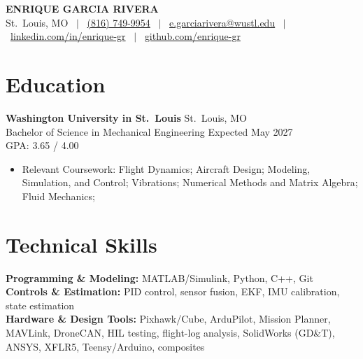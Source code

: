 \documentclass[11pt, letterpaper]{article}
\newcommand{\myphone}{(816) 749-9954}
\begin{document}
\begin{center}
{\fontsize{18pt}{22pt}\selectfont\bfseries ENRIQUE GARCIA RIVERA} \\[4pt]
\small
St.\ Louis, MO \ $|$ \ \href{tel:+18167499954}{\myphone} \ $|$ \
\href{mailto:e.garciarivera@wustl.edu}{e.garciarivera@wustl.edu} \ $|$ \
\href{https://www.linkedin.com/in/enrique-gr}{linkedin.com/in/enrique-gr} \ $|$ \
\href{https://github.com/enrique-gr}{github.com/enrique-gr}
\end{center}
\section{Education}
\textbf{Washington University in St.\ Louis} \hfill St.\ Louis, MO \\
Bachelor of Science in Mechanical Engineering \hfill Expected May 2027 \\
GPA: 3.65 / 4.00
\begin{itemize}
\item Relevant Coursework: Flight Dynamics; Aircraft Design; Modeling, Simulation, and Control; Vibrations; Numerical Methods and Matrix Algebra; Fluid Mechanics; 
\end{itemize}
\section{Technical Skills}
\textbf{Programming \& Modeling:} MATLAB/Simulink, Python, C++, Git \\
\textbf{Controls \& Estimation:} PID control, sensor fusion, EKF, IMU calibration, state estimation \\
\textbf{Hardware \& Design Tools:} Pixhawk/Cube, ArduPilot, Mission Planner, MAVLink, DroneCAN, HIL testing, flight-log analysis, SolidWorks (GD\&T), ANSYS, XFLR5, Teensy/Arduino, composites
\end{document}
